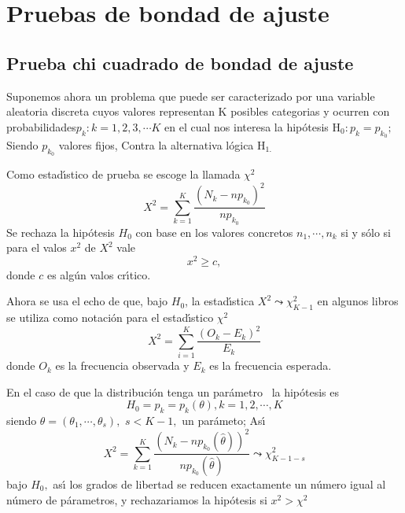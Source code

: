 


\section{}

\section{Pruebas de bondad de ajuste}

\subsection{Prueba chi cuadrado de bondad de ajuste}

Suponemos ahora un problema que puede ser caracterizado por una variable
aleatoria discreta cuyos valores representan K posibles categorias y ocurren
con probabilidades\newline $p_{k}:k=1,2,3,\cdots K$ en el cual nos interesa la
hip\'{o}tesis H$_{0}:p_{k}=p_{k_{0}};$ Siendo $p_{k_{0}}$ valores fijos,
Contra la alternativa l\'{o}gica H$_{1.}$

Como estad\'{\i}stico de prueba se escoge la llamada $\chi^{2}$%
\[
X^{2}=\sum_{k=1}^{K}\frac{\left(  N_{k}-np_{k_{0}}\right)  ^{2}}{np_{k_{0}}}%
\]
Se rechaza la hip\'{o}tesis $H_{0}$ con base en los valores concretos
$n_{1},\cdots,n_{k}$ si y s\'{o}lo si para el valos $x^{2}$ de $X^{2}$ vale
\[
x^{2}\geq c,
\]
donde $c$ es alg\'{u}n valos cr\'{\i}tico.

Ahora se usa el echo de que, bajo $H_{0}$, la estad\'{\i}stica $X^{2}%
\leadsto\chi_{K-1}^{2}$ en algunos libros se utiliza como notaci\'{o}n para el
estad\'{\i}stico $\chi^{2}$%
\[
X^{2}=\sum_{i=1}^{K}\frac{\left(  O_{k}-E_{k}\right)  ^{2}}{E_{k}}%
\]
donde $O_{k}$ es la frecuencia observada y $E_{k}$ es la frecuencia esperada.

En el caso de que la distribuci\'{o}n tenga un par\'{a}metro \ la
hip\'{o}tesis es
\[
H_{0}=p_{k}=p_{k}\left(  \theta\right)  ,k=1,2,\cdots,K
\]
siendo $\theta=\left(  \theta_{1},\cdots,\theta_{s}\right)  ,$ $s<K-1,$ un
par\'{a}meto; As\'{\i}
\[
X^{2}=\sum_{k=1}^{K}\frac{\left(  N_{k}-np_{k_{0}}\left(  \hat{\theta}\right)
\right)  ^{2}}{np_{k_{0}}\left(  \hat{\theta}\right)  }\leadsto\chi
_{K-1-s}^{2}%
\]
bajo $H_{0},$ as\'{\i} los grados de libertad se reducen exactamente un
n\'{u}mero igual al n\'{u}mero de p\'{a}rametros, y rechazariamos la
hip\'{o}tesis si $x^{2}>\chi^{2}$

